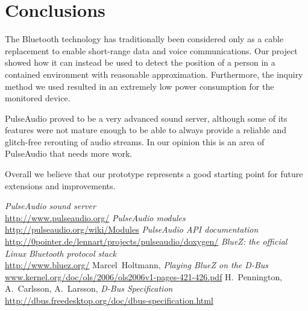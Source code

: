 \documentclass[conference]{IEEEtran}
\begin{document}
\section{Conclusions}
The Bluetooth technology has traditionally been considered only as a cable replacement to enable short-range data and voice communications. Our project showed how it can instead be used to detect the position of a person in a contained environment with reasonable approximation. Furthermore, the inquiry method we used resulted in an extremely low power consumption for the monitored device.

PulseAudio proved to be a very advanced sound server, although some of its features were not mature enough to be able to always provide a reliable and glitch-free rerouting of audio streams. In our opinion this is an area of PulseAudio that needs more work.

Overall we believe that our prototype represents a good starting point for future extensions and improvements.


\begin{thebibliography}{1}
	\emph{PulseAudio sound server} \\
	\url{http://www.pulseaudio.org/}
	\emph{PulseAudio modules} \\
	\url{http://pulseaudio.org/wiki/Modules}
	\emph{PulseAudio API documentation} \\
	\url{http://0pointer.de/lennart/projects/pulseaudio/doxygen/}
	\emph{BlueZ: the official Linux Bluetooth protocol stack} \\
	\url{http://www.bluez.org/}
	Marcel~Holtmann,
	\emph{Playing BlueZ on the D-Bus} \\
	\url{www.kernel.org/doc/ols/2006/ols2006v1-pages-421-426.pdf}
	H.~Pennington, A.~Carlsson, A.~Larsson,
	\emph{D-Bus Specification} \\
	\url{http://dbus.freedesktop.org/doc/dbus-specification.html}
\end{thebibliography}
\end{document}
